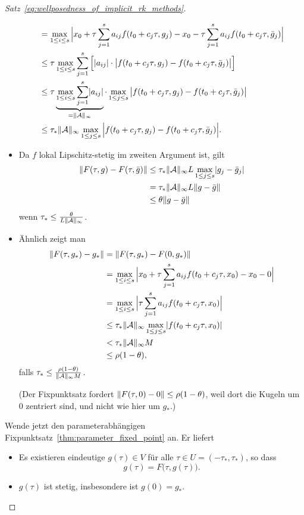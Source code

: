 \begin{proof}[Satz~\ref{eq:wellposedness_of_implicit_rk_methods}]
\begin{itemize}
\begin{align*}
			&= \max_{1\le i \le s} \Big| x_0 + \tau \sum_{j=1}^s a_{ij} f(t_0 + c_j \tau, g_j ) - x_0
				- \tau \sum_{j=1}^s a_{ij} f(t_0 + c_j \tau, \bar g_j ) \Big| \\
			&\le \tau \max_{1\le i \le s} \sum_{j=1}^s \Big [\lvert a_{ij} \rvert
			\cdot \big| f(t_0 + c_j \tau, g_j ) -  f(t_0 + c_j \tau, \bar g_j ) \big| \Big] \\
			&\le \tau \underbrace{\max_{1\le i \le s} \sum_{j=1}^s \lvert a_{ij} \rvert}_{= \lVert \mathcal A \rVert_\infty}
			\cdot \max_{1 \le j \le s} \big| f(t_0 + c_j \tau, g_j ) -  f(t_0 + c_j \tau, \bar g_j ) \big| \\
			& \le \tau_\ast \lVert \mathcal A \rVert_\infty  \max_{1\le j \le s}  \Big| f(t_0 + c_j \tau, g_j) - f(t_0 + c_j \tau, \bar g_j)\Big|.
			\end{align*} 
		\item Da $f$ lokal Lipschitz-stetig im zweiten Argument ist, gilt
		\begin{align*}
			\lVert  F(\tau,g) - F(\tau, \bar g) \rVert &\le \tau_\ast \lVert \mathcal A \rVert_\infty L \max_{1\le j \le s}  \lvert g_j - \bar g_j \rvert \\
			&= \tau_\ast \lVert \mathcal A \rVert_\infty L \lVert g - \bar g \rVert \\
			& \le \theta \lVert g - \bar g \rVert
		\end{align*} 
		wenn $\tau_\ast \le \frac{\theta}{L\lVert \mathcal{A} \rVert_\infty}$.
		\item Ähnlich zeigt man
		\begin{align*}
			\lVert F(\tau, g_\ast) - g_\ast \rVert
			& =
			\lVert F(\tau, g_\ast) - F(0,g_\ast) \rVert \\
			& = \max_{1 \le i \le s} \Big| x_0 + \tau \sum_{j=1}^s a_{ij} f(t_0 + c_j \tau, x_0) - x_0 -0\Big| \\
			& =
			\max_{1 \le i \le s} \Big| \tau \sum_{j=1}^s a_{ij} f(t_0 + c_j \tau, x_0) \Big| \\
			& \le
			\tau_\ast \lVert \mathcal{A} \rVert_\infty \max_{1 \le j \le s} \lvert f(t_0 + c_j \tau,x_0) \rvert \\
			& <
			\tau_\ast \lVert \mathcal{A} \rVert_\infty M \\
			& \le \rho(1 - \theta),
		\end{align*}
		falls $\tau_\ast \le \frac{\rho(1-\theta)}{\lVert \mathcal{A} \rVert_\infty M}$.

		(Der Fixpunktsatz fordert $\lVert F(\tau, 0) - 0 \rVert \le \rho(1 - \theta)$,
		weil dort die Kugeln um $0$ zentriert sind, und nicht wie hier um $g_\ast$.)
		\end{itemize}
	Wende jetzt den parameterabhängigen Fixpunktsatz~\ref{thm:parameter_fixed_point} an. Er liefert
	\begin{itemize}
		\item Es existieren eindeutige $g(\tau) \in V$ für alle $\tau \in U = (-\tau_\ast,\tau_\ast)$, so dass
		$$ g(\tau) = F\big(\tau, g(\tau)\big). $$
		\item $g(\tau)$ ist stetig, insbesondere ist $g(0) = g_\ast$.
	\end{itemize}
\end{proof}

